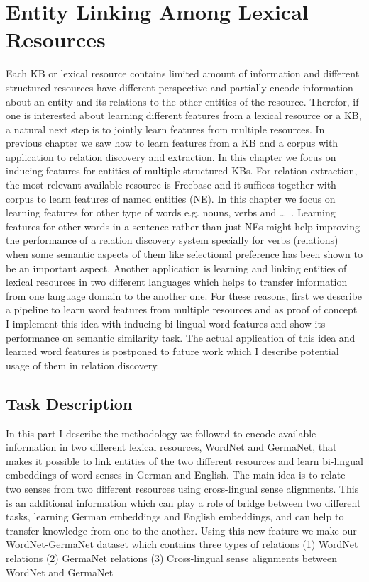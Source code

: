 \chapter{Entity Linking Among Lexical Resources}
\label{ch:exp-ent-link}

Each KB or lexical resource contains limited amount of information and
different structured resources have different perspective and partially encode
information about an entity and its relations to the other entities of the
resource. Therefor, if one is interested about learning different features from
a lexical resource or a KB, a natural next step is to jointly learn features
from multiple resources. In previous chapter we saw how to learn features from
a KB and a corpus with application to relation discovery and extraction. In this
chapter we focus on inducing features for entities of multiple structured KBs.
For relation extraction, the most relevant available resource is Freebase and
it suffices together with corpus to learn features of named entities (NE). In
this chapter we focus on learning features for other type of words e.g. nouns,
verbs and \ldots~. Learning features for other words in a sentence rather than
just NEs might help improving the performance of a relation discovery system
specially for verbs (relations) when some semantic aspects of them like
selectional preference has been shown to be an important aspect. Another
application is learning and linking entities of lexical resources in two
different languages which helps to transfer information from one language domain
to the another one. For these reasons, first we describe a pipeline to learn
word features from multiple resources and as proof of concept I implement this
idea with inducing bi-lingual word features and show its performance
on semantic similarity task. The actual application of this idea and learned
word features is postponed to future work which I describe potential usage of
them in relation discovery.


\section{Task Description}
\label{sec:xkb-task-desc}

In this part I describe the methodology we followed to encode available information 
in two different lexical resources, WordNet and GermaNet, that makes it possible to link entities of the two different
resources and learn bi-lingual 
embeddings of word senses in German and English.  
The main idea is to relate two senses from two different resources using cross-lingual sense alignments.
This is an additional information which can play a role of bridge between two
different tasks, learning German embeddings and English embeddings, and can help to transfer knowledge from one to the another.
Using this new feature we make our WordNet-GermaNet dataset which contains three
types of relations
(1) WordNet relations 
(2) GermaNet relations
(3) Cross-lingual sense alignments between WordNet and GermaNet

